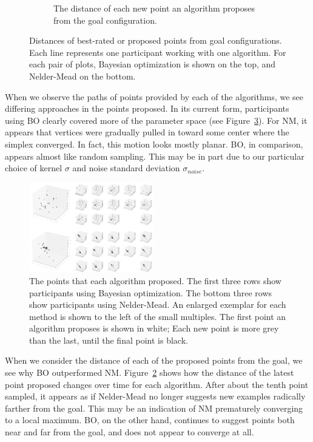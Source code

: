 \begin{figure}
\begin{subfigure}[b]{0.48\textwidth}
    \caption{%
      The distance of each new point an algorithm proposes from the goal configuration.
    }\label{fig:point_distances}
  \end{subfigure}
  \caption{%
    Distances of best-rated or proposed points from goal configurations.
    Each line represents one participant working with one algorithm.
    For each pair of plots,
    Bayesian optimization is shown on the top, and 
    Nelder-Mead on the bottom.
  }
\end{figure}

When we observe the paths of points provided by each of the algorithms, we see differing approaches in the points proposed.
In its current form, participants using BO clearly covered more of the parameter space (see Figure~\ref{fig:coverage}).
For NM, it appears that vertices were gradually pulled in toward some center where the simplex converged.
In fact, this motion looks mostly planar.
BO, in comparison, appears almost like random sampling.
This may be in part due to our particular choice of kernel $\sigma$ and noise standard deviation $\sigma_{noise}$.

\begin{figure}
  \centering
  \includegraphics[width=0.48\textwidth]{figures/scatters}
  \caption{%
    The points that each algorithm proposed.
    The first three rows show participants using Bayesian optimization.
    The bottom three rows show participants using Nelder-Mead.
    An enlarged exemplar for each method is shown to the left of the small multiples.
    The first point an algorithm proposes is shown in white;
    Each new point is more grey than the last, until the final point is black.
  }\label{fig:coverage}
\end{figure}

When we consider the distance of each of the proposed points from the goal, we see why BO outperformed NM\@.
Figure~\ref{fig:point_distances} shows how the distance of the latest point proposed changes over time for each algorithm.
After about the tenth point sampled, it appears as if Nelder-Mead no longer suggests new examples radically farther from the goal.
This may be an indication of NM prematurely converging to a local maximum.
BO, on the other hand, continues to suggest points both near and far from the goal, and does not appear to converge at all.

